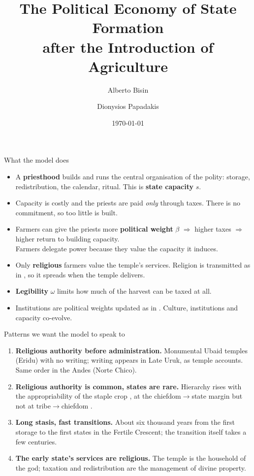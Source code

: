 \documentclass[11pt,aspectratio=169]{beamer}
\title{The Political Economy of State Formation\\after the Introduction of Agriculture}
\author{Alberto Bisin \and Dionysios Papadakis}
\date{\today}
\begin{document}
\begin{frame}
\titlepage
\end{frame}

\begin{frame}{What the model does}
\begin{itemize}
\item A \textbf{priesthood} builds and runs the central organisation of the polity: storage,
redistribution, the calendar, ritual. This is \textbf{state capacity} $s$.
\item Capacity is costly and the priests are paid \emph{only} through taxes. There is no
commitment, so too little is built.
\item Farmers can give the priests more \textbf{political weight} $\beta$ $\Rightarrow$ higher
taxes $\Rightarrow$ higher return to building capacity.\\
Farmers delegate power \alert{because they value the capacity it induces}.
\item Only \textbf{religious} farmers value the temple's services. Religion is transmitted as in
\citet{bisin2001}, so it spreads when the temple delivers.
\item \textbf{Legibility} $\omega$ limits how much of the harvest can be taxed at all.
\item Institutions are political weights updated as in \citet{bisin2024joint}. Culture,
institutions and capacity co-evolve.
\end{itemize}
\end{frame}

\begin{frame}{Patterns we want the model to speak to}
\begin{enumerate}
\item \textbf{Religious authority before administration.} Monumental Ubaid temples (Eridu) with no
writing; writing appears in Late Uruk, as temple accounts. Same order in the Andes (Norte Chico).
\item \textbf{Religious authority is common, states are rare.} Hierarchy rises with the
appropriability of the staple crop \citep{mayshar2022}, at the chiefdom$\to$state margin but not
at tribe$\to$chiefdom \citep{cook2026}.
\item \textbf{Long stasis, fast transitions.} About six thousand years from the first storage to the
first states in the Fertile Crescent; the transition itself takes a few centuries.
\item \textbf{The early state's services are religious.} The temple is the household of the god;
taxation and redistribution are the management of divine property.
\end{enumerate}
\end{frame}
\end{document}
